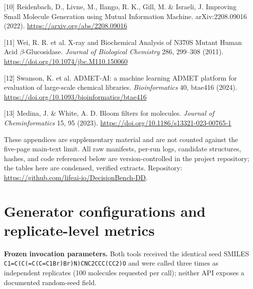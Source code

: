 \documentclass{article}
\begin{document}
[10] Reidenbach, D., Livne, M., Ilango, R. K., Gill, M. \& Israeli, J. Improving Small Molecule Generation using Mutual Information Machine. arXiv:2208.09016 (2022). \url{https://arxiv.org/abs/2208.09016}

[11] Wei, R. R. et al. X-ray and Biochemical Analysis of N370S Mutant Human Acid $\beta$-Glucosidase. \textit{Journal of Biological Chemistry} 286, 299--308 (2011). \url{https://doi.org/10.1074/jbc.M110.150060}

[12] Swanson, K. et al. ADMET-AI: a machine learning ADMET platform for evaluation of large-scale chemical libraries. \textit{Bioinformatics} 40, btae416 (2024). \url{https://doi.org/10.1093/bioinformatics/btae416}

[13] Medina, J. \& White, A. D. Bloom filters for molecules. \textit{Journal of Cheminformatics} 15, 95 (2023). \url{https://doi.org/10.1186/s13321-023-00765-1}

\clearpage
\appendix

These appendices are supplementary material and are not counted against the five-page main-text limit. All raw manifests, per-run logs, candidate structures, hashes, and code referenced below are version-controlled in the project repository; the tables here are condensed, verified extracts. Repository: \url{https://github.com/lifeai-io/DecisionBench-DD}.

\FloatBarrier
\section{Generator configurations and replicate-level metrics}
\label{app:a}

\textbf{Frozen invocation parameters.} Both tools received the identical seed SMILES \texttt{C1=C(C(=C(C=C1Br)Br)N)CNC2CCC(CC2)O} and were called three times as independent replicates (100 molecules requested per call); neither API exposes a documented random-seed field.
\end{document}
